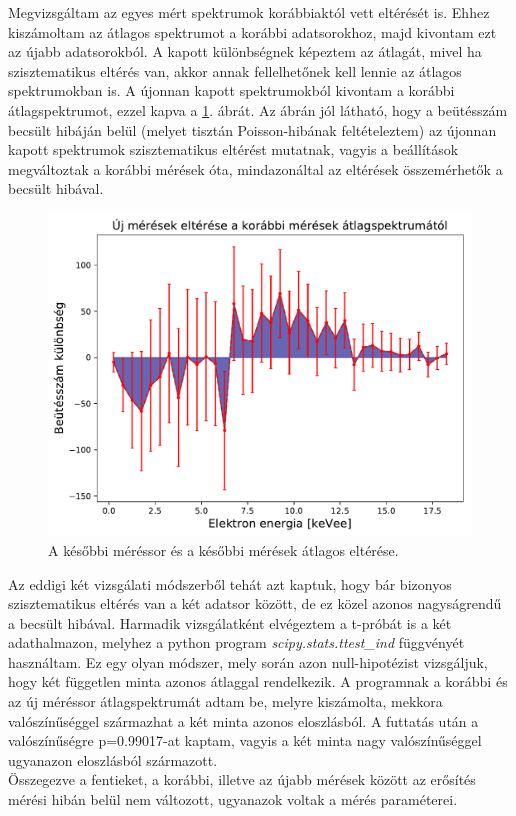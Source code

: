 \documentclass[12pt,a4paper]{article}
\begin{document}
\hspace*{10pt} Megvizsgáltam az egyes mért spektrumok korábbiaktól vett eltérését is. Ehhez kiszámoltam az átlagos spektrumot a korábbi adatsorokhoz, majd kivontam ezt az újabb adatsorokból. A kapott különbségnek képeztem az átlagát, mivel ha szisztematikus eltérés van, akkor annak fellelhetőnek kell lennie az átlagos spektrumokban is. A újonnan kapott spektrumokból kivontam a korábbi átlagspektrumot, ezzel kapva a \ref{fig:2a}. ábrát. Az ábrán jól látható, hogy a beütésszám becsült hibáján belül (melyet tisztán Poisson-hibának feltételeztem) az újonnan kapott spektrumok szisztematikus eltérést mutatnak, vagyis a beállítások megváltoztak a korábbi mérések óta, mindazonáltal az eltérések összemérhetők a becsült hibával.
\newpage
\begin{figure}[!h]
\centering
\includegraphics[width=0.8\linewidth]{elteres}
\caption{A későbbi méréssor és a későbbi mérések átlagos eltérése.}
\label{fig:2a}
\end{figure}
\hspace*{10pt} Az eddigi két vizsgálati módszerből tehát azt kaptuk, hogy bár bizonyos szisztematikus eltérés van a két adatsor között, de ez közel azonos nagyságrendű a becsült hibával. Harmadik vizsgálatként elvégeztem a t-próbát is a két adathalmazon, melyhez a python program \emph{scipy.stats.ttest\_ind} függvényét használtam. Ez egy olyan módszer, mely során azon null-hipotézist vizsgáljuk, hogy két független minta azonos átlaggal rendelkezik. A programnak a korábbi és az új méréssor átlagspektrumát adtam be, melyre kiszámolta, mekkora valószínűséggel származhat a két minta azonos eloszlásból. A futtatás után a valószínűségre p=0.99017-at kaptam, vagyis a két minta nagy valószínűséggel ugyanazon eloszlásból származott.\\
\hspace*{10pt} Összegezve a fentieket, a korábbi, illetve az újabb mérések között az erősítés mérési hibán belül nem változott, ugyanazok voltak a mérés paraméterei.
\end{document}
